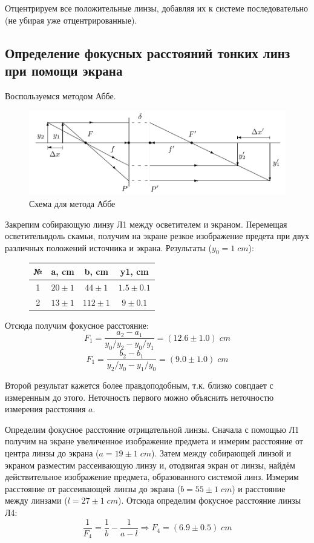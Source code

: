 \documentclass{article}
\begin{document}
Отцентрируем все положительные линзы, добавляя их к системе последовательно (не убирая уже отцентрированные).

\subsection{Определение фокусных расстояний тонких линз при помощи экрана}
Воспользуемся методом Аббе.
\begin{figure}[H]
  \centering
  \includegraphics[width = \textwidth]{Abbe.png}
  \caption{Схема для метода Аббе}
\end{figure}

Закрепим собирающую линзу Л1 между осветителем и экраном. Перемещая осветительвдоль скамьи, получим на
экране резкое изображение предета при двух различных положений источника и экрана. Результаты (\(y_0 = 1\; cm\)):

\begin{figure}[H]
  \centering
  \begin{tabular}{|c|c|c|c|}
    \hline
    № & a, cm    & b, cm    & y1, cm\\\hline
    1 & \(20 \pm 1\) & \(44 \pm 1\) & \(1.5\pm 0.1\) \\\hline
    2 & \(13 \pm 1\) & \(112 \pm 1\) & \(9\pm 0.1\) \\\hline
  \end{tabular}
\end{figure}

Отсюда получим фокусное расстояние:
\[ F_1 = \frac{a_2 - a_1}{y_0/y_2 - y_0/y_1} = (12.6 \pm 1.0)\; cm \]
\[ F_1 = \frac{b_2 - b_1}{y_2/y_0 - y_1/y_0} = (9.0 \pm 1.0)\; cm \]

Второй результат кажется более правдоподобным, т.к. близко совпдает с измеренным до этого. Неточность
первого можно объяснить неточностю измерения расстояния \(a\).

Определим фокусное расстояние отрицательной линзы. Сначала с помощью Л1 получим на экране
увеличенное изображение предмета и измерим расстояние от центра линзы до экрана (\(a = 19\pm1\; cm\)). Затем
между собирающей линзой и экраном разместим рассеивающую линзу и, отодвигая экран от линзы, найдём 
действительное изображение предмета, образованного системой линз.
Измерим расстояние от рассеивающей линзы до экрана (\(b = 55 \pm 1\; cm\)) и расстояние между линзами 
(\(l = 27 \pm 1\; cm\)). Отсюда определим фокусное расстояние линзы Л4:
\[ \frac{1}{F_4} = \frac{1}{b} - \frac{1}{a-l} \Rightarrow F_4 = (6.9\pm 0.5)\;cm\]
\end{document}
